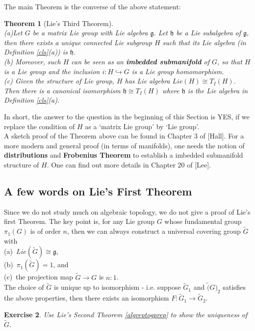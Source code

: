 \documentclass[11pt]{article}
\newtheorem{theorem}{Theorem}[section]
\newtheorem{exercise}[theorem]{Exercise}
\newcommand{\mf}[1]{\mathfrak{#1}}
\begin{document}
The main Theorem is the converse of the above statement:
\begin{theorem}[Lie's Third Theorem] \mbox{}\\
(a)Let $G$ be a matrix Lie group with Lie algebra $\mf{g}$. Let $\mf{h}$ be a Lie subalgebra of $\mf{g}$, then there exists a unique connected Lie subgroup $H$ such that its \textit{Lie algebra} (in Definition \ref{cls}(a)) is $\mf{h}$.\\
(b) Moreover, such $H$ can be seen as an \textbf{imbedded submanifold} of $G$, so that $H$ is a Lie group and the inclusion $i: H \hookrightarrow G$ is a Lie group homomorphism.\\
(c) Given the structure of Lie group, $H$ has Lie algebra $Lie(H) \cong T_I(H)$. Then there is a canonical isomorphism $\mf{h} \cong T_I(H)$ where $\mf{h}$ is the Lie algebra in Definition \ref{cls}(a).
\end{theorem}
In short, the answer to the question in the beginning of this Section is YES, if we replace the condition of $H$ as a `matrix Lie group' by `Lie group'.\\

A sketch proof of the Theorem above can be found in Chapter 3 of [Hall]. For a more modern and general proof (in terms of manifolds), one needs the notion of \textbf{distributions} and \textbf{Frobenius Theorem} to establish a imbedded submanifold structure of $H$. One can find out more details in Chapter 20 of [Lee].

\subsection{A few words on Lie's First Theorem}
Since we do not study much on algebraic topology, we do not give a proof of Lie's first Theorem. The key point is, for any Lie group $G$ whose fundamental group $\pi_1(G)$ is of order $n$, then we can always construct a universal covering group $\tilde{G}$ with\\
(a)\ $Lie(\tilde{G}) \cong \mf{g}$,\\
(b)\ $\pi_1(\tilde{G}) = 1$, and\\
(c)\ the projection map $\tilde{G} \to G$ is $n:1$.\\
The choice of $\tilde{G}$ is unique up to isomorphism - i.e. suppose $\tilde{G}_1$ and $\tilde(G)_2$ satisfies the above properties, then there exists an isomorphism $F: \tilde{G}_1 \to \tilde{G}_2$.
\begin{exercise}
Use Lie's Second Theorem \ref{algreptogprep} to show the uniqueness of $\tilde{G}$.
\end{exercise}
\end{document}
